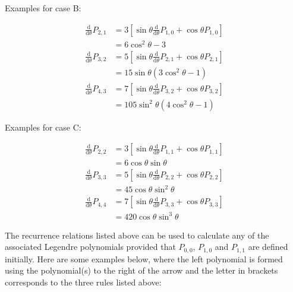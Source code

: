 \documentclass[]{article}
\begin{document}
		Examples for case B:
		
		\begin{align}
			\frac{\text{d}}{\text{d}\theta}P_{2,1} &= 3 \left[\sin{\theta}\frac{\text{d}}{\text{d}\theta}P_{1,0} + \cos{\theta}P_{1,0}\right] \\
			&= 6 \cos^2{\theta} - 3\\
			\frac{\text{d}}{\text{d}\theta}P_{3,2} &= 5 \left[\sin{\theta}\frac{\text{d}}{\text{d}\theta}P_{2,1} + \cos{\theta}P_{2,1}\right] \\
			&= 15\sin{\theta}(3\cos^2{\theta} -1)\\
			\frac{\text{d}}{\text{d}\theta}P_{4,3} &= 7 \left[\sin{\theta}\frac{\text{d}}{\text{d}\theta}P_{3,2} + \cos{\theta}P_{3,2}\right] \\
			&= 105\sin^2{\theta}(4\cos^2{\theta} - 1)
		\end{align}

		Examples for case C:
		
		\begin{align}
			\frac{\text{d}}{\text{d}\theta}P_{2,2} &= 3 \left[\sin{\theta}\frac{\text{d}}{\text{d}\theta}P_{1,1} + \cos{\theta}P_{1,1}\right] \\
			&= 6 \cos{\theta}\sin{\theta} \\
			\frac{\text{d}}{\text{d}\theta}P_{3,3} &= 5 \left[\sin{\theta}\frac{\text{d}}{\text{d}\theta}P_{2,2} + \cos{\theta}P_{2,2}\right] \\
			&= 45\cos{\theta}\sin^2{\theta}\\
			\frac{\text{d}}{\text{d}\theta}P_{4,4} &= 7 \left[\sin{\theta}\frac{\text{d}}{\text{d}\theta}P_{3,3} + \cos{\theta}P_{3,3}\right] \\
			&= 420\cos{\theta}\sin^3{\theta}
		\end{align}
		
	
		The recurrence relations listed above can be used to calculate any of the associated Legendre polynomials provided that $P_{0,0}$, $P_{1,0}$ and $P_{1,1}$ are defined initially. Here are some examples below, where the left polynomial is formed using the polynomial(s) to the right of the arrow and the letter in brackets corresponds to the three rules listed above:
		
\end{document}

